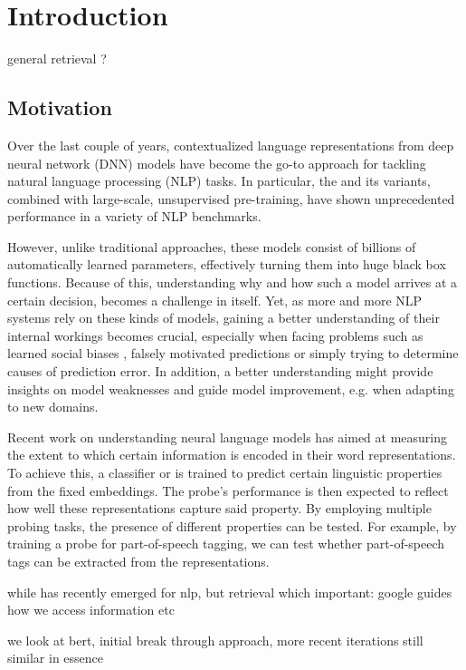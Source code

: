 \chapter{Introduction}
general retrieval ?
\section{Motivation}
Over the last couple of years, contextualized language representations from deep neural network (DNN) models have become the go-to approach for tackling natural language processing (NLP) tasks. In particular, the  \cite{vaswani2017attention} and its variants, combined with large-scale, unsupervised pre-training, have shown unprecedented performance in a variety of NLP benchmarks.

However, unlike traditional approaches, these models consist of billions of automatically learned parameters, effectively turning them into huge black box functions. Because of this, understanding why and how such a model arrives at a certain decision, becomes a challenge in itself. Yet, as more and more NLP systems rely on these kinds of models, gaining a better understanding of their internal workings becomes crucial, especially when facing problems such as learned social biases \cite{Nadeem2021StereoSetMS,Bender2021OnTD, kurita2019measuring}, falsely motivated predictions \cite{10.1145/2939672.2939778, DBLP:journals/corr/abs-1802-00614} or simply trying to determine causes of prediction error. In addition, a better understanding might provide insights on model weaknesses and guide model improvement, e.g. when adapting to new domains.

Recent work on understanding neural language models has aimed at measuring the extent to which certain information is encoded in their word representations. To achieve this, a  classifier or  is trained to predict certain linguistic properties from the fixed embeddings. The probe's performance is then expected to reflect how well these representations capture said property. By employing multiple probing tasks, the presence of different properties can be tested. For example, by training a probe for part-of-speech tagging, we can test whether part-of-speech tags can be extracted from the representations.


while has recently emerged for nlp, but retrieval which important: google guides how we access information etc

we look at bert, initial break through approach, more recent iterations still similar in essence

